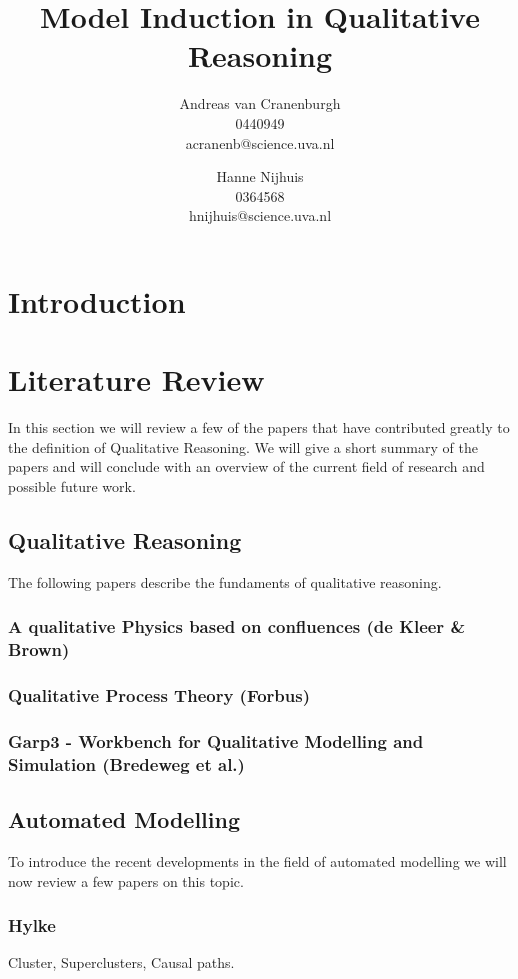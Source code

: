 \documentclass{article}
\title{Model Induction in Qualitative Reasoning}
\author{Andreas van Cranenburgh \\ 0440949 \\ acranenb@science.uva.nl \and Hanne Nijhuis \\ 0364568 \\ hnijhuis@science.uva.nl}
\begin{document}
\maketitle

\begin{abstract}
\end{abstract}

\section{Introduction}

\section{Literature Review}
In this section we will review a few of the papers that have contributed greatly to the definition of Qualitative Reasoning. We will give a short summary of the papers and will conclude with an overview of the current field of research and possible future work.
\subsection{Qualitative Reasoning}
The following papers describe the fundaments of qualitative reasoning.
\subsubsection{A qualitative Physics based on confluences (de Kleer \& Brown)}
\subsubsection{Qualitative Process Theory (Forbus)}
\subsubsection{Garp3 - Workbench for Qualitative Modelling and Simulation (Bredeweg et al.)}

\subsection{Automated Modelling}
To introduce the recent developments in the field of automated modelling we will now review a few papers on this topic.
\subsubsection{Hylke}
Cluster, Superclusters, Causal paths.
\end{document}
